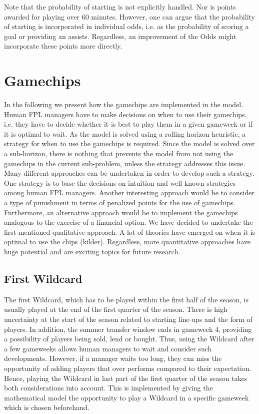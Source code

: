 Note that the probability of starting is not explicitly handled. Nor is points awarded for playing over 60 minutes. However, one can argue that the probability of starting is incorporated in individual odds, i.e. as the probability of scoring a goal or providing an assists. Regardless, an improvement of the Odds might incorporate these points more directly.

\section{Gamechips} \label{Ch.5_Game_chips}

In the following we present how the gamechips are implemented in the model. Human FPL managers have to make decisions on when to use their gamechips, i.e. they have to decide whether it is best to play them in a given gameweek or if it is optimal to wait. As the model is solved using a rolling horizon heuristic, a strategy for when to use the gamechips is required. Since the model is solved over a sub-horizon, there is nothing that prevents the model from not using the gamechips in the current sub-problem, unless the strategy addresses this issue. Many different approaches can be undertaken in order to develop such a strategy. One strategy is to base the decisions on intuition and well known strategies among human FPL managers. Another interesting approach would be to consider a type of punishment in terms of penalized points for the use of gamechips. Furthermore, an alternative approach would be to implement the gamechips analogous to the exercise of a financial option. We have decided to undertake the first-mentioned qualitative approach. A lot of theories have emerged on when it is optimal to use the chips (kilder). Regardless, more quantitative approaches have huge potential and are exciting topics for future research.

\subsection{First Wildcard}
The first Wildcard, which has to be played within the first half of the season, is usually played at the end of the first quarter of the season. There is high uncertainty at the start of the season related to starting line-ups and the form of players. In addition, the summer transfer window ends in gameweek 4, providing a possibility of players being sold, lend or bought. Thus, using the Wildcard after a few gameweeks allows human managers to wait and consider such developments. However, if a manager waits too long, they can miss the opportunity of adding players that over performs compared to their expectation. Hence, playing the Wildcard in last part of the first quarter of the season takes both considerations into account. This is implemented by giving the mathematical model the opportunity to play a Wildcard in a specific gameweek which is chosen beforehand.


